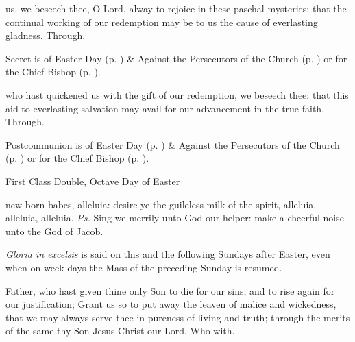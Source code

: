 
\secret
{} us, we beseech thee, O Lord, alway to rejoice in these paschal mysteries: that the continual working of our redemption may be to us the cause of everlasting gladness. Through.
\begin{rubric}
     Secret is of Easter Day (p. \pageref{EasterSecret}) \&  Against the Persecutors of the Church (p. \pageref{SPAgainst}) or for the Chief Bishop (p. \pageref{SPChiefBishop}).
\end{rubric}


\postcommunion
{} who hast quickened us with the gift of our redemption, we beseech thee: that this aid to everlasting salvation may avail for our advancement in the true faith. Through.
\begin{rubric}
     Postcommunion is of Easter Day (p. \pageref{EasterPostcommunion}) \&  Against the Persecutors of the Church (p. \pageref{SPAgainst}) or for the Chief Bishop (p. \pageref{SPChiefBishop}).
\end{rubric}



\begin{inhead}
    {First Class Double, Octave Day of Easter}
\end{inhead}

\properantiphonfix

\introit
{} new-born babes, alleluia: desire ye the guileless milk of the spirit, alleluia, alleluia, alleluia. \textit{Ps.} Sing we merrily unto God our helper: make a cheerful noise unto the God of Jacob.
\begin{rubric}
    \emph{Gloria in excelsis} is said on this and the following Sundays after Easter, even when on week-days the Mass of the preceding Sunday is resumed.
\end{rubric}
\collect
{} Father, who hast given thine only Son to die for our sins, and to rise again for our justification; Grant us so to put away the leaven of malice and wickedness, that we may always serve thee in pureness of living and truth; through the merits of the same thy Son Jesus Christ our Lord. Who with.

